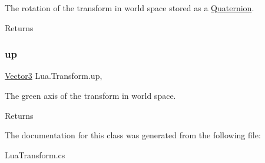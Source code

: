 The rotation of the transform in world space stored as a \mbox{\hyperlink{class_lua_1_1_quaternion}{Quaternion}}. 

\begin{DoxyReturn}{Returns}

\end{DoxyReturn}
\mbox{\label{class_lua_1_1_transform_a98b72263be2f13a2917369c22b8539f3}} 
\subsubsection{\texorpdfstring{up}{up}}
{\footnotesize\ttfamily \mbox{\hyperlink{class_lua_1_1_vector3}{Vector3}} Lua.\+Transform.\+up\hspace{0.3cm}{\ttfamily [get]}, {\ttfamily [set]}}



The green axis of the transform in world space. 

\begin{DoxyReturn}{Returns}

\end{DoxyReturn}


The documentation for this class was generated from the following file\+:\begin{DoxyCompactItemize}
\item 
Lua\+Transform.\+cs\end{DoxyCompactItemize}
